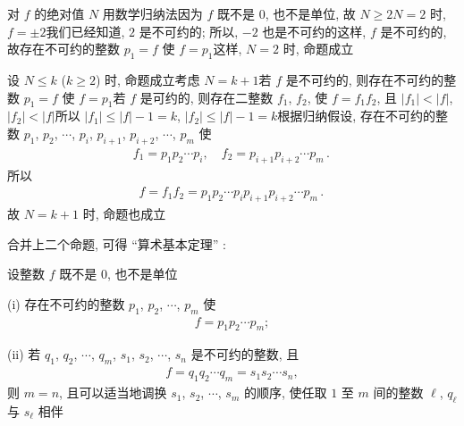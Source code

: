 \begin{pf}
    对 $f$ 的绝对值 $N$ 用数学归纳法\period 因为 $f$ 既不是 $0$, 也不是单位, 故 $N \geq 2$\period $N = 2$ 时, $f = \pm 2$\period 我们已经知道, $2$ 是不可约的; 所以, $-2$ 也是不可约的\period 这样, $f$ 是不可约的, 故存在不可约的整数 $p_1 = f$ 使 $f = p_1$\period 这样, $N = 2$ 时, 命题成立\period

    设 $N \leq k$ ($k \geq 2$) 时, 命题成立\period 考虑 $N = k+1$\period 若 $f$ 是不可约的, 则存在不可约的整数 $p_1 = f$ 使 $f = p_1$\period 若 $f$ 是可约的, 则存在二整数 $f_1$, $f_2$, 使 $f = f_1 f_2$, 且 $|f_1| < |f|$, $|f_2| < |f|$\period 所以 $|f_1| \leq |f| - 1 = k$, $|f_2| \leq |f| - 1 = k$\period 根据归纳假设, 存在不可约的整数 $p_1$, $p_2$, $\cdots$, $p_i$, $p_{i+1}$, $p_{i+2}$, $\cdots$, $p_m$ 使
    \begin{align*}
        f_1 = p_1 p_2 \cdots p_i, \quad f_2 = p_{i+1} p_{i+2} \cdots p_m \period
    \end{align*}
    所以
    \begin{align*}
        f = f_1 f_2 = p_1 p_2 \cdots p_i p_{i+1} p_{i+2} \cdots p_m \period
    \end{align*}
    故 $N = k+1$ 时, 命题也成立\period
\end{pf}

合并上二个命题, 可得 ``算术基本定理'' :
\begin{proposition}
    设整数 $f$ 既不是 $0$, 也不是单位\period

    (i) 存在不可约的整数 $p_1$, $p_2$, $\cdots$, $p_m$ 使
    \begin{align*}
        f = p_1 p_2 \cdots p_m;
    \end{align*}

    (ii) 若 $q_1$, $q_2$, $\cdots$, $q_m$, $s_1$, $s_2$, $\cdots$, $s_n$ 是不可约的整数, 且
    \begin{align*}
        f = q_1 q_2 \cdots q_m = s_1 s_2 \cdots s_n,
    \end{align*}
    则 $m = n$, 且可以适当地调换 $s_1$, $s_2$, $\cdots$, $s_m$ 的顺序, 使任取 $1$ 至 $m$ 间的整数 $\ell$, $q_\ell$ 与 $s_\ell$ 相伴\period
\end{proposition}

